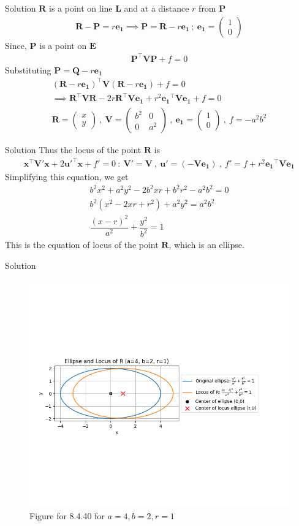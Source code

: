 \documentclass{beamer}
\let\vec\mathbf
\providecommand{\brak}[1]{\ensuremath{\left(#1\right)}}
\theoremstyle{remark}
\newcommand{\myvec}[1]{\ensuremath{\begin{pmatrix}#1\end{pmatrix}}}
\begin{document}
\begin{frame}{Solution}
$\vec{R}$ is a point on line $\vec{L}$ and at a distance $r$ from $\vec{P}$
\begin{align}
    \vec{R} - \vec{P}= r\vec{e_1} \implies \vec{P}=\vec{R} - r\vec{e_1}\  ; \ \vec{e_1}=\myvec{1\\0}
\end{align}
Since, $\vec{P}$ is a point on $\vec{E}$
\begin{align}
    \vec{P}^{\top}\vec{V}\vec{P} + f=0
\end{align}
Substituting $\vec{P} = \vec{Q} -r\vec{e_1}$
\begin{align}
    \brak{\vec{R} -r\vec{e_1}}^{\top}\vec{V}\brak{\vec{R} -r\vec{e_1}} + f=0 \\\implies \vec{R}^{\top}\vec{V}\vec{R} - 2r\vec{R}^{\top}\vec{V}\vec{e_1} + r^2\vec{e_1}^{\top}\vec{V}\vec{e_1}+f=0\\
    \vec{R}= \myvec{x\\y} \ , \ \vec{V}=\myvec{b^2 & 0 \\ 0 & a^2} \ , \ \vec{e_1}=\myvec{1\\0} \ , \ f=-a^2b^2
\end{align}
\end{frame}

\begin{frame}{Solution}
Thus the locus of the point $\vec{R}$ is
\begin{align}
    \vec{x}^{\top}\vec{V'}\vec{x} + 2 \vec{u'}^{\top}\vec{x} + f'=0 \ : \ \vec{V'}=\vec{V} \ , \ \vec{u'}=\brak{-\vec{V}\vec{e_1}} \ , \ f'=f+ r^2\vec{e_1}^{\top}\vec{V}\vec{e_1}
\end{align}
Simplifying this equation, we get
\begin{align}
    b^2x^2 + a^2y^2 - 2b^2 xr + b^2r^2 - a^2b^2=0\\
    b^2\brak{x^2 - 2xr + r^2} + a^2y^2 =a^2b^2\\
    \dfrac{\brak{x-r}^2}{a^2} + \dfrac{y^2}{b^2} =1
\end{align}
This is the equation of locus of the point $\vec{R}$, which is an ellipse.
\end{frame}
\begin{frame}{Solution}
    \begin{figure}[H]
        \centering
        \includegraphics[width=0.5\columnwidth]{figs/1.png}
        \caption{Figure for 8.4.40 for $a=4, b=2, r=1$}
        \label{fig:placeholder}
    \end{figure}
\end{frame}
\end{document}

